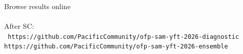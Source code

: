 \documentclass[aspectratio=169]{beamer}
\begin{document}

\begin{frame}{Browse results online}
  \vspace{4ex}
  \centering
  \\[2ex]
  \\[10ex]
  \darkgray
  After SC:\\[2ex]
  \tt
  https://github.com/PacificCommunity/ofp-sam-yft-2026-diagnostic\\[1ex]
  https://github.com/PacificCommunity/ofp-sam-yft-2026-ensemble
\end{frame}
\end{document}
